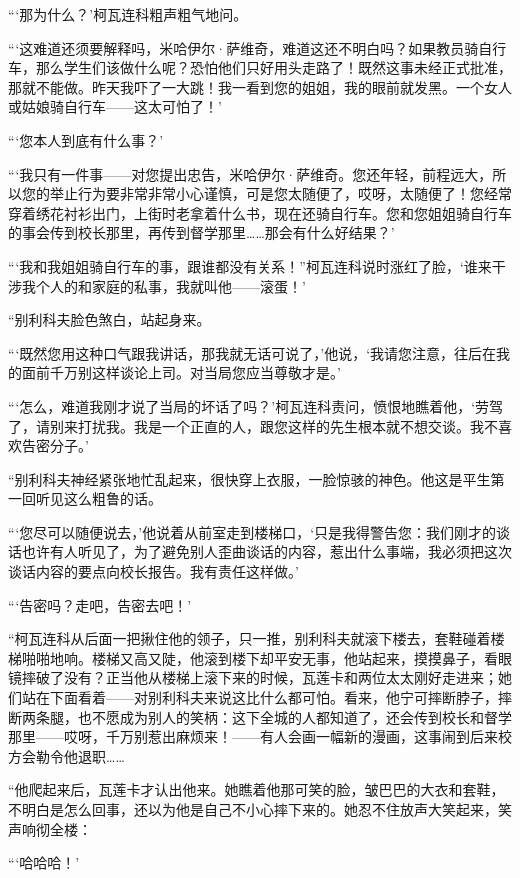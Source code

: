 \documentclass[12pt,UTF-8,openany]{ctexbook}
\begin{document}
\begin{normalsize}
    “‘那为什么？’柯瓦连科粗声粗气地问。
    
    “‘这难道还须要解释吗，米哈伊尔·萨维奇，难道这还不明白吗？如果教员骑自行车，那么学生们该做什么呢？恐怕他们只好用头走路了！既然这事未经正式批准，那就不能做。昨天我吓了一大跳！我一看到您的姐姐，我的眼前就发黑。一个女人或姑娘骑自行车——这太可怕了！’
    
    “‘您本人到底有什么事？’
    
    “‘我只有一件事——对您提出忠告，米哈伊尔·萨维奇。您还年轻，前程远大，所以您的举止行为要非常非常小心谨慎，可是您太随便了，哎呀，太随便了！您经常穿着绣花衬衫出门，上街时老拿着什么书，现在还骑自行车。您和您姐姐骑自行车的事会传到校长那里，再传到督学那里……那会有什么好结果？’
    
    “‘我和我姐姐骑自行车的事，跟谁都没有关系！”柯瓦连科说时涨红了脸，‘谁来干涉我个人的和家庭的私事，我就叫他——滚蛋！’
    
    “别利科夫脸色煞白，站起身来。
    
    “‘既然您用这种口气跟我讲话，那我就无话可说了，’他说，‘我请您注意，往后在我的面前千万别这样谈论上司。对当局您应当尊敬才是。’
    
    “‘怎么，难道我刚才说了当局的坏话了吗？’柯瓦连科责问，愤恨地瞧着他，‘劳驾了，请别来打扰我。我是一个正直的人，跟您这样的先生根本就不想交谈。我不喜欢告密分子。’
    
    “别利科夫神经紧张地忙乱起来，很快穿上衣服，一脸惊骇的神色。他这是平生第一回听见这么粗鲁的话。
    
    “‘您尽可以随便说去，’他说着从前室走到楼梯口，‘只是我得警告您：我们刚才的谈话也许有人听见了，为了避免别人歪曲谈话的内容，惹出什么事端，我必须把这次谈话内容的要点向校长报告。我有责任这样做。’
    
    “‘告密吗？走吧，告密去吧！’
    
    “柯瓦连科从后面一把揪住他的领子，只一推，别利科夫就滚下楼去，套鞋碰着楼梯啪啪地响。楼梯又高又陡，他滚到楼下却平安无事，他站起来，摸摸鼻子，看眼镜摔破了没有？正当他从楼梯上滚下来的时候，瓦莲卡和两位太太刚好走进来；她们站在下面看着——对别利科夫来说这比什么都可怕。看来，他宁可摔断脖子，摔断两条腿，也不愿成为别人的笑柄：这下全城的人都知道了，还会传到校长和督学那里——哎呀，千万别惹出麻烦来！——有人会画一幅新的漫画，这事闹到后来校方会勒令他退职……
    
    “他爬起来后，瓦莲卡才认出他来。她瞧着他那可笑的脸，皱巴巴的大衣和套鞋，不明白是怎么回事，还以为他是自己不小心摔下来的。她忍不住放声大笑起来，笑声响彻全楼：
    
    “‘哈哈哈！’
    

\end{normalsize}
\end{document}
